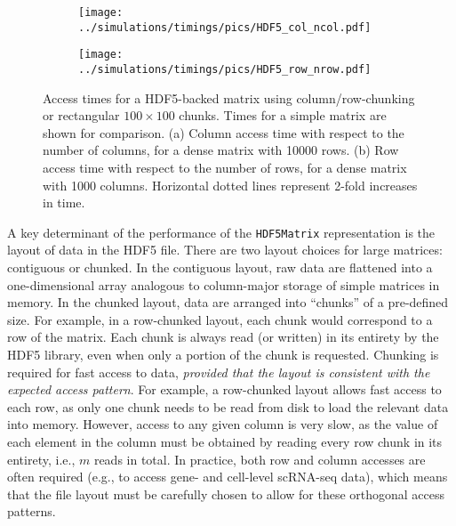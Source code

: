 \documentclass[10pt,letterpaper]{article}
\newcommand{\code}[1]{\texttt{#1}}
\begin{document}
\begin{figure}[bt]
    \begin{subfigure}[b]{0.49\textwidth}
        \texttt{[image: ../simulations/timings/pics/HDF5\_col\_ncol.pdf]}
        \caption{}
    \end{subfigure}
    \begin{subfigure}[b]{0.49\textwidth}
        \texttt{[image: ../simulations/timings/pics/HDF5\_row\_nrow.pdf]}
        \caption{}
    \end{subfigure}
    \caption{Access times for a HDF5-backed matrix using column/row-chunking or rectangular $100\times100$ chunks.
        Times for a simple matrix are shown for comparison.
        (a) Column access time with respect to the number of columns, for a dense matrix with 10000 rows.
        (b) Row access time with respect to the number of rows, for a dense matrix with 1000 columns.
        Horizontal dotted lines represent 2-fold increases in time.
    }
    \label{fig:hdf5time}
\end{figure}

A key determinant of the performance of the \code{HDF5Matrix} representation is the layout of data in the HDF5 file.
There are two layout choices for large matrices: contiguous or chunked.
In the contiguous layout, raw data are flattened into a one-dimensional array analogous to column-major storage of simple matrices in memory.
In the chunked layout, data are arranged into ``chunks'' of a pre-defined size.
For example, in a row-chunked layout, each chunk would correspond to a row of the matrix.
Each chunk is always read (or written) in its entirety by the HDF5 library, even when only a portion of the chunk is requested.
Chunking is required for fast access to data, \textit{provided that the layout is consistent with the expected access pattern}.
For example, a row-chunked layout allows fast access to each row, as only one chunk needs to be read from disk to load the relevant data into memory.
However, access to any given column is very slow, as the value of each element in the column must be obtained by reading every row chunk in its entirety, i.e., $m$ reads in total.
In practice, both row and column accesses are often required (e.g., to access gene- and cell-level scRNA-seq data), which means that the file layout must be carefully chosen to allow for these orthogonal access patterns.
\end{document}
